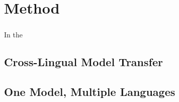 \chapter{Method}

\paragraph{}
In the 


\section{Cross-Lingual Model Transfer}


\section{One Model, Multiple Languages}
